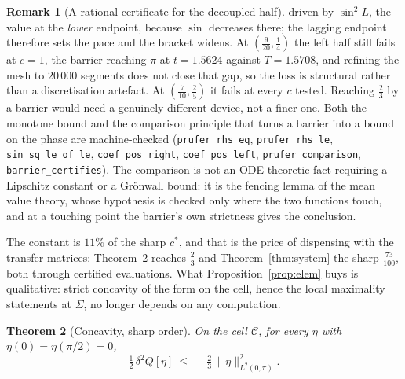 \documentclass[11pt]{article}
\newtheorem{theorem}{Theorem}
\theoremstyle{definition}
\newtheorem{remark}[theorem]{Remark}
\begin{document}
\begin{remark}[A rational certificate for the decoupled half]
driven by $\sin^2 L$, the value at the \emph{lower} endpoint, because $\sin$ decreases
there; the lagging endpoint therefore sets the pace and the bracket widens. At
$(\tfrac9{20},\tfrac14)$ the left half still fails at $c=1$, the barrier reaching $\pi$ at
$t=1.5624$ against $T=1.5708$, and refining the mesh to $20\,000$ segments does not close
that gap, so the loss is structural rather than a discretisation artefact. At
$(\tfrac7{10},\tfrac25)$ it fails at every $c$ tested. Reaching $\tfrac23$ by a barrier
would need a genuinely different device, not a finer one. Both the monotone bound and the comparison
principle that turns a barrier into a bound on the phase are machine-checked
(\verb|prufer_rhs_eq|, \verb|prufer_rhs_le|, \verb|sin_sq_le_of_le|,
\verb|coef_pos_right|, \verb|coef_pos_left|, \verb|prufer_comparison|,
\verb|barrier_certifies|). The comparison is not an ODE-theoretic fact requiring a
Lipschitz constant or a Grönwall bound: it is the fencing lemma of the mean value theory,
whose hypothesis is checked only where the two functions touch, and at a touching point
the barrier's own strictness gives the conclusion.
\end{remark}

The constant is $11\%$ of the sharp $c^\ast$, and that is the price of dispensing with
the transfer matrices: Theorem~\ref{thm:sharp} reaches $\tfrac23$ and
Theorem~\ref{thm:system} the sharp $\tfrac{73}{100}$, both through certified
evaluations. What Proposition~\ref{prop:elem} buys is qualitative: strict concavity of
the form on the cell, hence the local maximality statements at $\Sigma$, no longer
depends on any computation.

\begin{theorem}[Concavity, sharp order]\label{thm:sharp}
On the cell $\mathcal C$, for every $\eta$ with $\eta(0)=\eta(\pi/2)=0$,
\begin{equation}\label{eq:sharp}
  \tfrac12\,\delta^2Q[\eta]\ \le\ -\tfrac23\,\|\eta\|^2_{L^2(0,\pi)} .
\end{equation}
\end{theorem}
\end{document}
